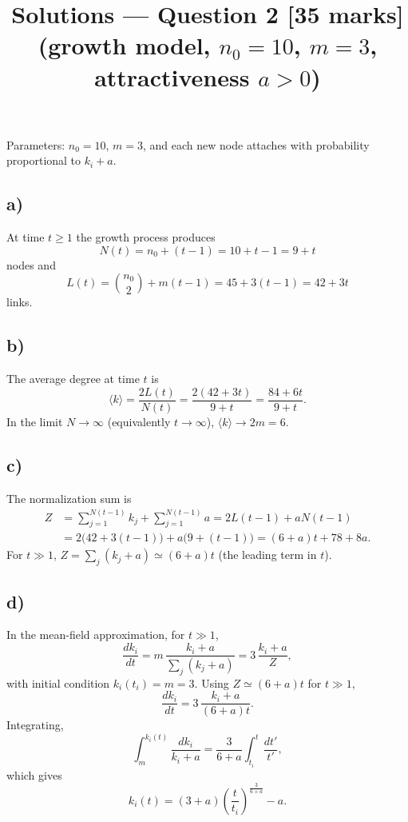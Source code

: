 \documentclass[11pt,a4paper]{article}
\title{Solutions --- Question 2 [35 marks]\\(growth model, $n_0=10$, $m=3$, attractiveness $a>0$)}
\author{}
\date{}
\begin{document}
\maketitle

Parameters: $n_0 = 10$, $m = 3$, and each new node attaches with probability proportional to $k_i + a$.

\subsection*{a)}

At time $t \ge 1$ the growth process produces
\[
  N(t) = n_0 + (t - 1) = 10 + t - 1 = 9 + t
\]
nodes and
\[
  L(t) = \binom{n_0}{2} + m(t - 1) = 45 + 3(t - 1) = 42 + 3t
\]
links.

\subsection*{b)}

The average degree at time $t$ is
\[
  \langle k \rangle = \frac{2L(t)}{N(t)}
  = \frac{2(42 + 3t)}{9 + t}
  = \frac{84 + 6t}{9 + t}.
\]
In the limit $N \to \infty$ (equivalently $t \to \infty$), $\langle k \rangle \to 2m = 6$.

\subsection*{c)}

The normalization sum is
\begin{align*}
  Z &= \sum_{j=1}^{N(t-1)} k_j + \sum_{j=1}^{N(t-1)} a
   = 2L(t-1) + a N(t-1) \\
    &= 2\bigl(42 + 3(t - 1)\bigr) + a\bigl(9 + (t - 1)\bigr)
     = (6 + a)t + 78 + 8a.
\end{align*}
For $t \gg 1$, $\displaystyle Z = \sum_{j} (k_j + a) \simeq (6 + a)t$ (the leading term in $t$).

\subsection*{d)}

In the mean-field approximation, for $t \gg 1$,
\[
  \frac{dk_i}{dt} = m\,\frac{k_i + a}{\sum_j (k_j + a)}
  = 3\,\frac{k_i + a}{Z},
\]
with initial condition $k_i(t_i) = m = 3$. Using $Z \simeq (6 + a)t$ for $t \gg 1$,
\[
  \frac{dk_i}{dt} = 3\,\frac{k_i + a}{(6 + a)t}.
\]
Integrating,
\[
  \int_{m}^{k_i(t)} \frac{dk_i}{k_i + a}
  = \frac{3}{6 + a} \int_{t_i}^{t} \frac{dt'}{t'},
\]
which gives
\[
  k_i(t) = (3 + a)\left(\frac{t}{t_i}\right)^{\frac{3}{6 + a}} - a.
\]
\end{document}
